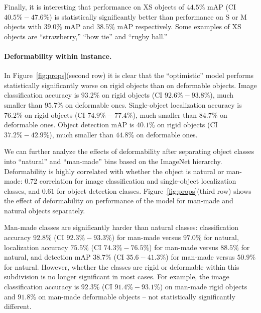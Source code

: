Finally, it is interesting that performance on XS objects of $44.5\%$ mAP (CI $40.5\%-47.6\%$) is statistically significantly better than performance on S or M objects with $39.0\%$ mAP and $38.5\%$ mAP respectively. Some examples of XS objects are ``strawberry,'' ``bow tie'' and ``rugby ball.''



\paragraph{Deformability within instance.} In Figure~\ref{fig:props}(second row) it is clear that the ``optimistic'' model performs statistically significantly worse on rigid objects than on deformable objects. Image classification accuracy is $93.2\%$ on rigid objects (CI $92.6\%-93.8\%$), much smaller than $95.7\%$ on deformable ones. Single-object localization accuracy is $76.2\%$ on rigid objects (CI $74.9\%-77.4\%$), much smaller than $84.7\%$ on deformable ones. 
Object detection mAP is $40.1\%$ on rigid objects (CI $37.2\%-42.9\%$), much smaller than $44.8\%$ on deformable ones.


We can further analyze the effects of deformability after separating object classes into ``natural'' and ``man-made'' bins based on the ImageNet hierarchy. Deformability is highly correlated with whether the object is natural or man-made: $0.72$ correlation for image classification and single-object localization classes, and $0.61$ for object detection classes. Figure~\ref{fig:props}(third row) shows the effect of deformability on performance of the model for man-made and natural objects separately.

Man-made classes are significantly harder than natural classes: classification accuracy $92.8\%$ (CI $92.3\%-93.3\%$) for man-made versus $97.0\%$ for natural, localization accuracy $75.5\%$ (CI $74.3\%-76.5\%$) for man-made versus $88.5\%$ for natural, and detection mAP $38.7\%$ (CI $35.6-41.3\%$) for man-made versus $50.9\%$ for natural. However, whether the classes are rigid or deformable within this subdivision is no longer significant in most cases. For example, the image classification accuracy is $92.3\%$ (CI $91.4\%-93.1\%$) on man-made rigid objects and $91.8\%$ on man-made deformable objects -- not statistically significantly different. 

